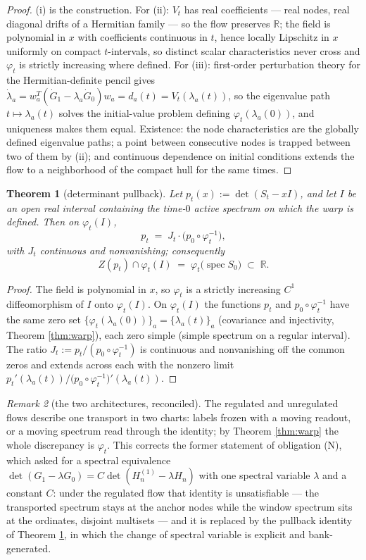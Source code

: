 \documentclass[11pt]{article}
\theoremstyle{plain}
\newtheorem{theorem}{Theorem}
\theoremstyle{definition}
\theoremstyle{remark}
\newtheorem{remark}[theorem]{Remark}
\newcommand{\R}{\mathbb{R}}
\DeclareMathOperator{\spec}{spec}
\begin{document}
\begin{proof}
(i) is the construction. For (ii): $V_t$ has real coefficients --- real nodes, real
diagonal drifts of a Hermitian family --- so the flow preserves $\R$; the field is
polynomial in $x$ with coefficients continuous in $t$, hence locally Lipschitz in $x$
uniformly on compact $t$-intervals, so distinct scalar characteristics never cross and
$\varphi_t$ is strictly increasing where defined. For (iii): first-order perturbation
theory for the Hermitian-definite pencil gives
$\dot\lambda_a=w_a^{T}(\dot G_1-\lambda_a\dot G_0)w_a=d_a(t)=V_t(\lambda_a(t))$, so the
eigenvalue path $t\mapsto\lambda_a(t)$ solves the initial-value problem defining
$\varphi_t(\lambda_a(0))$, and uniqueness makes them equal. Existence: the node
characteristics are the globally defined eigenvalue paths; a point between consecutive
nodes is trapped between two of them by (ii); and continuous dependence on initial
conditions extends the flow to a neighborhood of the compact hull for the same times.
\end{proof}

\begin{theorem}[determinant pullback]\label{thm:pullback}
Let $p_t(x):=\det(S_t-xI)$, and let $I$ be an open real interval containing the
time-$0$ active spectrum on which the warp is defined. Then on $\varphi_t(I)$,
\[
  p_t \;=\; J_t\cdot\bigl(p_0\circ\varphi_t^{-1}\bigr),
\]
with $J_t$ continuous and nonvanishing; consequently
\[
  Z(p_t)\cap\varphi_t(I)\;=\;\varphi_t\bigl(\spec S_0\bigr)\;\subset\;\R .
\]
\end{theorem}

\begin{proof}
The field is polynomial in $x$, so $\varphi_t$ is a strictly increasing $C^1$
diffeomorphism of $I$ onto $\varphi_t(I)$. On $\varphi_t(I)$ the functions $p_t$ and
$p_0\circ\varphi_t^{-1}$ have the same zero set
$\{\varphi_t(\lambda_a(0))\}_a=\{\lambda_a(t)\}_a$ (covariance and injectivity,
Theorem \ref{thm:warp}), each zero simple (simple spectrum on a regular interval). The
ratio $J_t:=p_t/(p_0\circ\varphi_t^{-1})$ is continuous and nonvanishing off the common
zeros and extends across each with the nonzero limit
$p_t'(\lambda_a(t))\big/\bigl(p_0\circ\varphi_t^{-1}\bigr)'(\lambda_a(t))$.
\end{proof}

\begin{remark}[the two architectures, reconciled]\label{rem:architectures}
The regulated and unregulated flows describe one transport in two charts: labels frozen
with a moving readout, or a moving spectrum read through the identity; by Theorem
\ref{thm:warp} the whole discrepancy is $\varphi_t$. This corrects the former statement
of obligation (N), which asked for a spectral equivalence
$\det(G_1-\lambda G_0)=C\det(H^{(1)}_n-\lambda H_n)$ with one spectral variable
$\lambda$ and a constant $C$: under the regulated flow that identity is unsatisfiable
--- the transported spectrum stays at the anchor nodes while the window spectrum sits at
the ordinates, disjoint multisets --- and it is replaced by the pullback identity of
Theorem \ref{thm:pullback}, in which the change of spectral variable is explicit and
bank-generated.
\end{remark}
\end{document}
